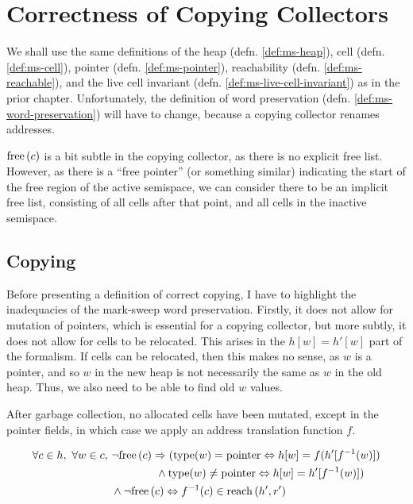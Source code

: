 \chapter{Correctness of Copying Collectors}
\label{sec:copying}

We shall use the same definitions of the heap
(defn. \ref{def:ms-heap}), cell (defn. \ref{def:ms-cell}), pointer
(defn. \ref{def:ms-pointer}), reachability
(defn. \ref{def:ms-reachable}), and the live cell invariant
(defn. \ref{def:ms-live-cell-invariant}) as in the prior
chapter. Unfortunately, the definition of word preservation
(defn. \ref{def:ms-word-preservation}) will have to change, because a
copying collector renames addresses.

$\mathrm{free}\left(c\right)$ is a bit subtle in the copying collector, as there is no
explicit free list. However, as there is a ``free pointer'' (or
something similar) indicating the start of the free region of the
active semispace, we can consider there to be an implicit free list,
consisting of all cells after that point, and all cells in the
inactive semispace.

\section{Copying}
\label{sec:copying-copying}

Before presenting a definition of correct copying, I have to highlight
the inadequacies of the mark-sweep word preservation. Firstly, it does
not allow for mutation of pointers, which is essential for a copying
collector, but more subtly, it does not allow for cells to be
relocated. This arises in the $h[w] = h'[w]$ part of the formalism. If
cells can be relocated, then this makes no sense, as $w$ is a pointer,
and so $w$ in the new heap is not necessarily the same as $w$ in the
old heap. Thus, we also need to be able to find old $w$ values.

\begin{definition}
  \label{def:c-correct-copying}
  After garbage collection, no allocated cells have been mutated,
  except in the pointer fields, in which case we apply an address
  translation function $f$.

  \begin{align*}
    \forall c \in h,\ \forall w \in c,\ &\lnot\mathrm{free}\left(c\right) \Rightarrow
    (\mathrm{type}(w) = \mathrm{pointer} \Leftrightarrow h[w] = f(h'[f^{-1}(w)])\\
    &\quad\quad\quad\quad \land \mathrm{type}(w) \neq \mathrm{pointer}
    \Leftrightarrow h[w] = h'[f^{-1}(w)])\\
    &\land \lnot\mathrm{free}\left(c\right) \Leftrightarrow f^{-1}(c) \in \mathrm{reach}\left(h', r'\right)
  \end{align*}
\end{definition}

